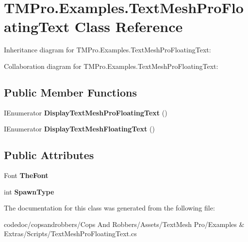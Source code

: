 \hypertarget{classTMPro_1_1Examples_1_1TextMeshProFloatingText}{}\section{T\+M\+Pro.\+Examples.\+Text\+Mesh\+Pro\+Floating\+Text Class Reference}
\label{classTMPro_1_1Examples_1_1TextMeshProFloatingText}


Inheritance diagram for T\+M\+Pro.\+Examples.\+Text\+Mesh\+Pro\+Floating\+Text\+:


Collaboration diagram for T\+M\+Pro.\+Examples.\+Text\+Mesh\+Pro\+Floating\+Text\+:
\subsection*{Public Member Functions}
\begin{DoxyCompactItemize}
\item 
\mbox{\label{classTMPro_1_1Examples_1_1TextMeshProFloatingText_a2d85960b568e04dd6dcd05db9c65fe69}} 
I\+Enumerator {\bfseries Display\+Text\+Mesh\+Pro\+Floating\+Text} ()
\item 
\mbox{\label{classTMPro_1_1Examples_1_1TextMeshProFloatingText_a44484a164aa2ba2f4826a1d060a7ae5b}} 
I\+Enumerator {\bfseries Display\+Text\+Mesh\+Floating\+Text} ()
\end{DoxyCompactItemize}
\subsection*{Public Attributes}
\begin{DoxyCompactItemize}
\item 
\mbox{\label{classTMPro_1_1Examples_1_1TextMeshProFloatingText_a9bb498ea133aa1535bc4a6bdc76fa533}} 
Font {\bfseries The\+Font}
\item 
\mbox{\label{classTMPro_1_1Examples_1_1TextMeshProFloatingText_afa4a7158646022f85c2961f4a0edfb61}} 
int {\bfseries Spawn\+Type}
\end{DoxyCompactItemize}


The documentation for this class was generated from the following file\+:\begin{DoxyCompactItemize}
\item 
codedoc/copsandrobbers/\+Cops And Robbers/\+Assets/\+Text\+Mesh Pro/\+Examples \& Extras/\+Scripts/Text\+Mesh\+Pro\+Floating\+Text.\+cs\end{DoxyCompactItemize}
